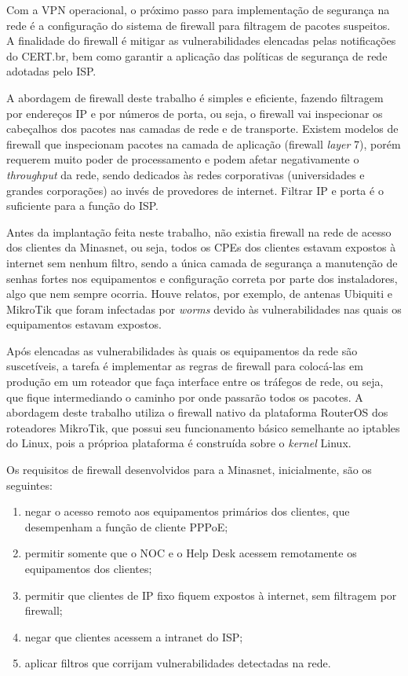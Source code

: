     Com a VPN operacional, o próximo passo para implementação de segurança na rede é a configuração do sistema de firewall para filtragem de pacotes suspeitos. A finalidade do firewall é mitigar as vulnerabilidades elencadas pelas notificações do CERT.br, bem como garantir a aplicação das políticas de segurança de rede adotadas pelo ISP.
    
    A abordagem de firewall deste trabalho é simples e eficiente, fazendo filtragem por endereços IP e por números de porta, ou seja, o firewall vai inspecionar os cabeçalhos dos pacotes nas camadas de rede e de transporte. Existem modelos de firewall que inspecionam pacotes na camada de aplicação (firewall \textit{layer} 7), porém requerem muito poder de processamento e podem afetar negativamente o \textit{throughput} da rede, sendo dedicados às redes corporativas (universidades e grandes corporações) ao invés de provedores de internet. Filtrar IP e porta é o suficiente para a função do ISP.
    
    Antes da implantação feita neste trabalho, não existia firewall na rede de acesso dos clientes da Minasnet, ou seja, todos os CPEs dos clientes estavam expostos à internet sem nenhum filtro, sendo a única camada de segurança a manutenção de senhas fortes nos equipamentos e configuração correta por parte dos instaladores, algo que nem sempre ocorria. Houve relatos, por exemplo, de antenas Ubiquiti e MikroTik que foram infectadas por \textit{worms} devido às vulnerabilidades nas quais os equipamentos estavam expostos.
    
    Após elencadas as vulnerabilidades às quais os equipamentos da rede são suscetíveis, a tarefa é implementar as regras de firewall para colocá-las em produção em um roteador que faça interface entre os tráfegos de rede, ou seja, que fique intermediando o caminho por onde passarão todos os pacotes. A abordagem deste trabalho utiliza o firewall nativo da plataforma RouterOS dos roteadores MikroTik, que possui seu funcionamento básico semelhante ao iptables do Linux, pois a próprioa plataforma é construída sobre o \textit{kernel} Linux.
    
    Os requisitos de firewall desenvolvidos para a Minasnet, inicialmente, são os seguintes: 
    
    \begin{enumerate}[label=\alph*)]
        \item negar o acesso remoto aos equipamentos primários dos clientes, que desempenham a função de cliente PPPoE;
        \item permitir somente que o NOC e o Help Desk acessem remotamente os equipamentos dos clientes;
        \item permitir que clientes de IP fixo fiquem expostos à internet, sem filtragem por firewall;
        \item negar que clientes acessem a intranet do ISP;
        \item aplicar filtros que corrijam vulnerabilidades detectadas na rede.
    \end{enumerate}
    
